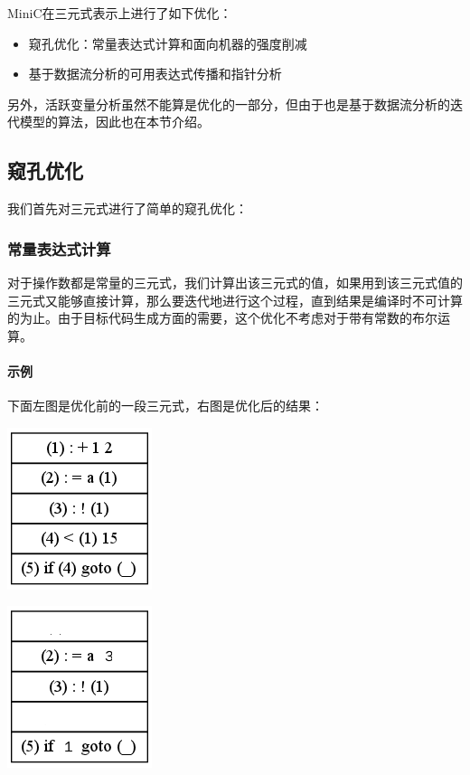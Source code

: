 MiniC在三元式表示上进行了如下优化：
\begin{itemize}
	\item 窥孔优化：常量表达式计算和面向机器的强度削减
	\item 基于数据流分析的可用表达式传播和指针分析
\end{itemize}
另外，活跃变量分析虽然不能算是优化的一部分，但由于也是基于数据流分析的迭代模型的算法，因此也在本节介绍。

\subsection{窥孔优化}
\label{peephole:intermidiate}
我们首先对三元式进行了简单的窥孔优化：
\subsubsection{常量表达式计算} 对于操作数都是常量的三元式，我们计算出该三元式的值，如果用到该三元式值的三元式又能够直接计算，那么要迭代地进行这个过程，直到结果是编译时不可计算的为止。由于目标代码生成方面的需要，这个优化不考虑对于带有常数的布尔运算。

\paragraph*{示例}
下面左图是优化前的一段三元式，右图是优化后的结果：
\begin{center}
\begin{minipage}{0.4\textwidth}
\begin{center}
	\includegraphics[scale=0.50]{before_const_expr.png}
	\label{fig:beforconstexpr}
\end{center}
\end{minipage}
\begin{minipage}{0.4\textwidth}
\begin{center}
	\includegraphics[scale=0.50]{after_const_expr.png}
	\label{fig:afterconstexpr}
\end{center}
\end{minipage}
\end{center}
